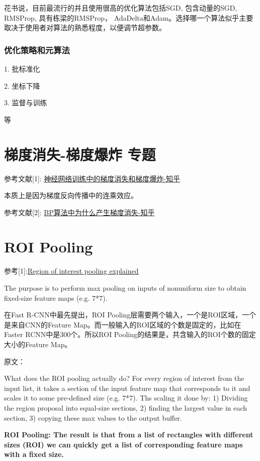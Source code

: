 花书说，目前最流行的并且使用很高的优化算法包括SGD, 包含动量的SGD, RMSProp, 具有栋梁的RMSProp， AdaDelta和Adam。选择哪一个算法似乎主要取决于使用者对算法的熟悉程度，以便调节超参数。

\subsubsection{优化策略和元算法}

1. 批标准化

2. 坐标下降

3. 监督与训练

等


\section{梯度消失-梯度爆炸 专题}

参考文献[1]: \href{https://zhuanlan.zhihu.com/p/25631496}{神经网络训练中的梯度消失和梯度爆炸-知乎}

本质上是因为梯度反向传播中的连乘效应。

参考文献[2]: \href{https://www.zhihu.com/question/49812013}{BP算法中为什么产生梯度消失-知乎}


\section{ROI Pooling}

参考[1]:\href{https://deepsense.ai/region-of-interest-pooling-explained/}{Region of interest pooling explained}

The purpose is to perform max pooling on inputs of nonuniform size to obtain fixed-size feature maps (e.g. 7*7).

在Fast R-CNN中最先提出，ROI Pooling层需要两个输入，一个是ROI区域，一个是来自CNN的Feature Map。而一般输入的ROI区域的个数是固定的，比如在Faster RCNN中是300个。所以ROI Pooling的结果是，共含输入的ROI个数的固定大小的Feature Map。

原文：

What does the ROI pooling actually do? For every region of interest from the input list, it takes a section of the input feature map that corresponds to it and scales it to some pre-defined size (e.g. 7*7). Ths scaling it done by: 1) Dividing the region proposal into equal-size sections, 2) finding the largest value in each section, 3) copying these max values to the output buffer.

\textbf{ROI Pooling: The result is that from a list of rectangles with different sizes (ROI) we can quickly get a list of corresponding feature maps with a fixed size. }


